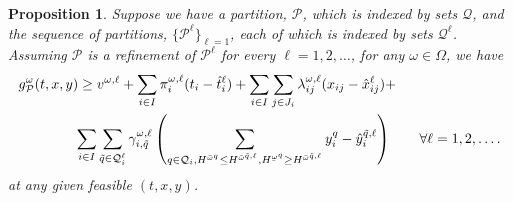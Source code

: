 \documentclass[11pt]{article}
\newtheorem{proposition}[theorem]{Proposition}
\renewcommand{\underbar}{\underaccent{\bar}}
\begin{document}
	\begin{proposition} \label{prop:validity}
		Suppose we have a partition, \(\mathcal{P}\), which is indexed by sets \(\mathcal{Q}\), and the sequence of partitions, \(\{\mathcal{P}^\ell\}_{\ell = 1}\), each of which is indexed by sets \(\mathcal{Q}^\ell\). Assuming \(\mathcal{P}\) is a refinement of \(\mathcal{P}^\ell\) for every \(\ell = 1,2, \dots\), for any \(\omega \in \Omega\), we have
		\begin{align} \label{cons:validlb}
			&g^\omega_{\mathcal{P}}(t,x,y) \geq v^{\omega,\ell} + \sum_{i \in I} \pi_i^{\omega,\ell} (t_i - \hat{t}_i^{\ell}) + \sum_{i \in I} \sum_{j \in J_i} \lambda_{ij}^{\omega,\ell} (x_{ij} - \hat{x}_{ij}^{\ell}) + \nonumber \\ 
			& \qquad \qquad \sum_{i \in I} \sum_{\tilde{q} \in \mathcal{Q}^{\ell}_i} \gamma_{i,\tilde{q}}^{\omega,\ell} \left( \sum_{q \in \mathcal{Q}_i, H^{\bar{\omega}^{q}} \leq H^{\bar{\omega}^{\tilde{q},\ell}},H^{\underbar{\omega}^{q}} \geq H^{\bar{\omega}^{\tilde{q},\ell}} }y_i^{q} - \hat{y}_i^{\tilde{q},\ell} \right) \qquad \forall \ell = 1,2, \dots. 
		\end{align}
		at any given feasible \((t,x,y)\).
	\end{proposition}
\end{document}
